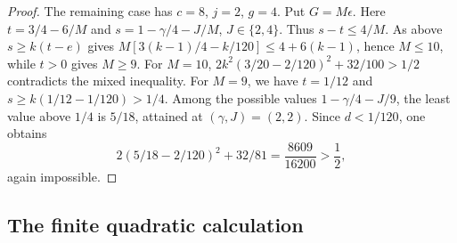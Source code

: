 \documentclass[11pt,a4paper]{article}
\numberwithin{equation}{section}
\begin{document}
\begin{proof}
The remaining case has $c=8$, $j=2$, $g=4$. Put $G=M\epsilon$.
Here $t=3/4-6/M$ and $s=1-\gamma/4-J/M$, $J\in\{2,4\}$.
Thus $s-t\le4/M$. As above $s\ge k(t-e)$ gives
$M[3(k-1)/4-k/120]\le4+6(k-1)$, hence $M\le10$, while
$t>0$ gives $M\ge9$. For $M=10$,
$2k^2(3/20-2/120)^2+32/100>1/2$ contradicts the mixed
inequality. For $M=9$, we have $t=1/12$ and
$s\ge k(1/12-1/120)>1/4$. Among the possible values
$1-\gamma/4-J/9$, the least value above $1/4$ is $5/18$,
attained at $(\gamma,J)=(2,2)$. Since $d<1/120$, one obtains
\[
 2(5/18-2/120)^2+32/81=\frac{8609}{16200}>\frac12,
\]
again impossible.
\end{proof}



\subsection{The finite quadratic calculation}
\end{document}
